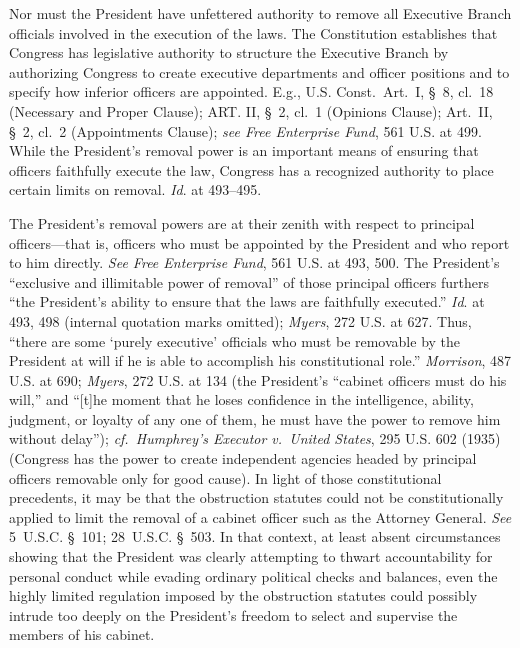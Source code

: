 Nor must the President have unfettered authority to remove all Executive Branch officials involved in the execution of the laws.
The Constitution establishes that Congress has legislative authority to structure the Executive Branch by authorizing Congress to create executive departments and officer positions and to specify how inferior officers are appointed.
E.g., U.S. Const.\ Art.~I, \S~8, cl.~18 (Necessary and Proper Clause); ART. II, \S~2, cl.~1 (Opinions Clause); Art.~II, \S~2, cl.~2 (Appointments Clause);
\textit{see Free Enterprise Fund}, 561 U.S. at 499. While the President's removal power is an important means of ensuring that officers faithfully execute the law, Congress has a recognized authority to place certain limits on removal.
\textit{Id}. at 493--495.

The President's removal powers are at their zenith with respect to principal officers---that is, officers who must be appointed by the President and who report to him directly.
\textit{See Free Enterprise Fund}, 561 U.S. at 493, 500.
The President's ``exclusive and illimitable power of removal'' of those principal officers furthers ``the President's ability to ensure that the laws are faithfully executed.''
\textit{Id}. at 493, 498 (internal quotation marks omitted);
\textit{Myers}, 272 U.S. at 627.
Thus, ``there are some `purely executive' officials who must be removable by the President at will if he is able to accomplish his constitutional role.''
\textit{Morrison}, 487 U.S. at 690;
\textit{Myers}, 272 U.S. at 134 (the President's ``cabinet officers must do his will,'' and ``[t]he moment that he loses confidence in the intelligence, ability, judgment, or loyalty of any one of them, he must have the power to remove him without delay'');
\textit{cf.~Humphrey's Executor v.\ United States}, 295 U.S. 602 (1935) (Congress has the power to create independent agencies headed by principal officers removable only for good cause).
In light of those constitutional precedents, it may be that the obstruction statutes could not be constitutionally applied to limit the removal of a cabinet officer such as the Attorney General.
\textit{See} 5~U.S.C. \S~101; 28~U.S.C. \S~503.
In that context, at least absent circumstances showing that the President was clearly attempting to thwart accountability for personal conduct while evading ordinary political checks and balances, even the highly limited regulation imposed by the obstruction statutes could possibly intrude too deeply on the President's freedom to select and supervise the members of his cabinet.

